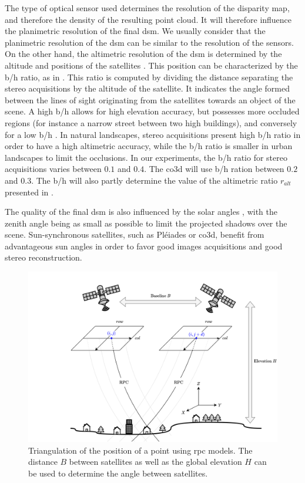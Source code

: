 The type of optical sensor used determines the resolution of the disparity map, and therefore the density of the resulting point cloud. It will therefore influence the planimetric resolution of the final \acrshort{dsm}. We usually consider that the planimetric resolution of the \acrshort{dsm} can be similar to the resolution of the sensors. On the other hand, the altimetric resolution of the \acrshort{dsm} is determined by the altitude and positions of the satellites \cite{qin_critical_2019}. This position can be characterized by the \acrfull{b/h} ratio, as in . This ratio is computed by dividing the distance separating the stereo acquisitions by the altitude of the satellite. It indicates the angle formed between the lines of sight originating from the satellites towards an object of the scene. A high \acrshort{b/h} allows for high elevation accuracy, but possesses more occluded regions (for instance a narrow street between two high buildings), and conversely for a low \acrshort{b/h} \cite{delon_small_2007}. In natural landscapes, stereo acquisitions present high \acrshort{b/h} ratio in order to have a high altimetric accuracy, while the \acrshort{b/h} ratio is smaller in urban landscapes to limit the occlusions.  In our experiments, the \acrshort{b/h} ratio for stereo acquisitions varies between $0.1$ and $0.4$. The \acrshort{co3d} will use \acrshort{b/h} ration between $0.2$ and $0.3$. The \acrshort{b/h} will also partly determine the value of the altimetric ratio $r_{alt}$ presented in .

The quality of the final \acrshort{dsm} is also influenced by the solar angles \cite{qin_critical_2019}, with the zenith angle being as small as possible to limit the projected shadows over the scene. Sun-synchronous satellites, such as Pléiades or \acrshort{co3d}, benefit from advantageous sun angles in order to favor good images acquisitions and good stereo reconstruction.

\begin{figure}
    \centering
    \includegraphics[width=0.8\linewidth]{Images/Chap_1/RPC.png}
    \caption{Triangulation of the position of a point using \acrshort{rpc} models. The distance $B$ between satellites as well as the global elevation $H$ can be used to determine the angle between satellites.}
    \label{fig:RPC}
\end{figure}

